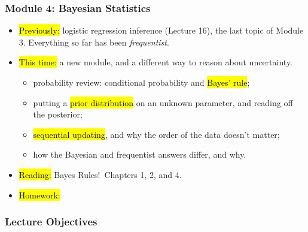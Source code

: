 

\begin{frame}
\frametitle{Module 4: Bayesian Statistics}
    \begin{itemize}
        \item \hl{Previously:} logistic regression inference (Lecture 16), the last topic of Module 3. Everything so far has been \emph{frequentist}.
        \item \hl{This time:} a new module, and a different way to reason about uncertainty.
          \begin{itemize}
              \item probability review: conditional probability and \hl{Bayes' rule};
              \item putting a \hl{prior distribution} on an unknown parameter, and reading off the posterior;
              \item \hl{sequential updating}, and why the order of the data doesn't matter;
              \item how the Bayesian and frequentist answers differ, and why.
          \end{itemize}
        \item \hl{Reading:} Bayes Rules!\ Chapters 1, 2, and 4.
        \item \hl{Homework:}
    \end{itemize}
\end{frame}


\begin{frame}
    \frametitle{Lecture Objectives}
\end{frame}


